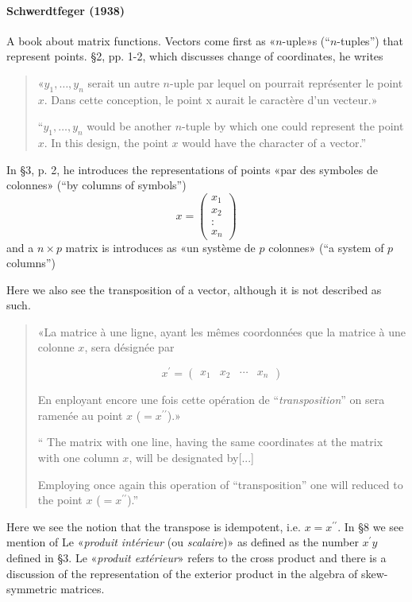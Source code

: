 

\paragraph{Schwerdtfeger (1938)~\cite{Schwerdtfeger1938}}

A book about matrix functions.
Vectors come first as «$n$-uple»s (``$n$-tuples'') that represent points. \S 2, pp. 1-2, which discusses change of coordinates, he writes
\begin{quote}
«$y_1, \dots, y_n$ serait un autre $n$-uple par lequel on pourrait représenter le point $x$. Dans cette conception, le point x aurait le caractère d'un vecteur.»

``$y_1, \dots, y_n$ would be another $n$-tuple by which one could represent the point $x$. In this design, the point $x$ would have the character of a vector.''
\end{quote}

In \S 3, p. 2, he introduces the representations of points «par des symboles de colonnes» (``by columns of symbols'')
\[
x =\begin{pmatrix}x_1\\x_2\\:\\x_n\end{pmatrix}
\]
and a $n \times p$ matrix is introduces as «un système de $p$ colonnes» (``a system of $p$ columns'')

Here we also see the transposition of a vector, although it is not described as such.
\begin{quote}
«La matrice à une ligne, ayant les mêmes coordonnées que la matrice à une colonne $x$, sera désignée par

\[
x^\prime = \begin{pmatrix}x_1 & x_2 & \cdots & x_n\end{pmatrix}
\]

En enployant encore une fois cette opération de ``\textit{transposition}'' on sera ramenée au point $x$ ($= x^{\prime\prime}$).»

``
The matrix with one line, having the same coordinates at the matrix with one column $x$, will be designated by[...]

Employing once again this operation of ``transposition'' one will reduced to the point $x$ ($= x^{\prime\prime}$).''

\end{quote}
Here we see the notion that the transpose is idempotent, i.e. $x = x^{\prime\prime}$.
In \S 8 we see mention of Le «\textit{produit intérieur} (ou \textit{scalaire})» as defined as the number $x^\prime y$ defined in \S 3. Le «\textit{produit extérieur}» refers to the cross product and there is a discussion of the representation of the exterior product in the algebra of skew-symmetric matrices.

